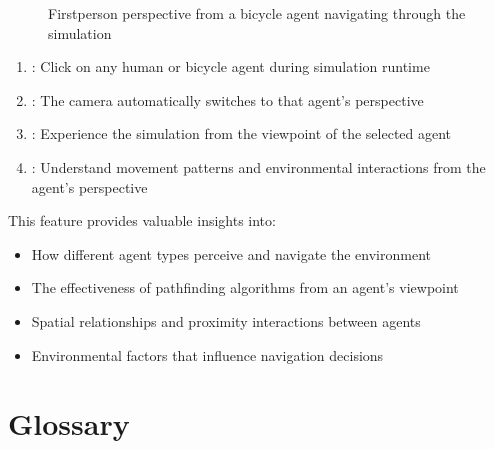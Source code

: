 \documentclass[letterpaper,10pt,english]{jupyterBook}
\begin{document}
\begin{figure}[htbp]
\centering
\capstart

\noindent{}
\caption{First\sphinxhyphen{}person perspective from a bicycle agent navigating through the simulation}\label{\detokenize{The Simulation:bicycle-agent-first-person-view}}\end{figure}
\begin{enumerate}
%
\item {} 
\sphinxAtStartPar
{}: Click on any human or bicycle agent during simulation runtime

\item {} 
\sphinxAtStartPar
{}: The camera automatically switches to that agent’s perspective

\item {} 
\sphinxAtStartPar
{}: Experience the simulation from the viewpoint of the selected agent

\item {} 
\sphinxAtStartPar
{}: Understand movement patterns and environmental interactions from the agent’s perspective

\end{enumerate}

\sphinxAtStartPar
This feature provides valuable insights into:
\begin{itemize}
\item {} 
\sphinxAtStartPar
How different agent types perceive and navigate the environment

\item {} 
\sphinxAtStartPar
The effectiveness of pathfinding algorithms from an agent’s viewpoint

\item {} 
\sphinxAtStartPar
Spatial relationships and proximity interactions between agents

\item {} 
\sphinxAtStartPar
Environmental factors that influence navigation decisions

\end{itemize}

\sphinxstepscope


\chapter{Glossary}
\label{\detokenize{glossary:glossary}}\label{\detokenize{glossary::doc}}
\end{document}
